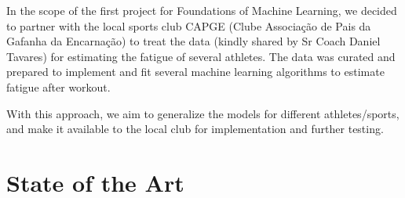 \documentclass[conference]{IEEEtran}
\begin{document}
In the scope of the first project for Foundations of Machine Learning, we decided to partner with the local sports club CAPGE (Clube Associação de Pais da Gafanha da Encarnação) to treat the data (kindly shared by Sr Coach Daniel Tavares) for estimating the fatigue of several athletes. The data was curated and prepared to implement and fit several machine learning algorithms to estimate fatigue after workout.

With this approach, we aim to generalize the models for different athletes/sports, and make it available to the local club for implementation and further testing. 



\section{State of the Art}
\end{document}
